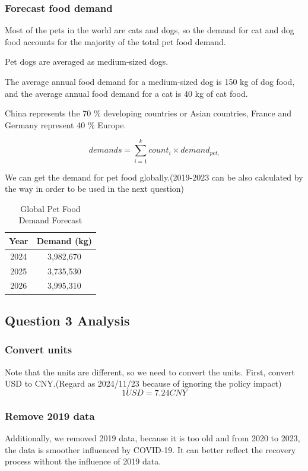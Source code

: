 \documentclass[withoutpreface,bwprint]{cumcmthesis} %
\begin{document}
\subsubsection{Forecast food demand}
\begin{assumption}
    Most of the pets in the world are cats and dogs, so the demand for cat and dog food accounts for the majority of the total pet food demand.
\end{assumption}
\begin{assumption}
    Pet dogs are averaged as medium-sized dogs.
\end{assumption}
\par The average annual food demand for a medium-sized dog is 150 kg of dog food, and the average annual food demand for a cat is 40 kg of cat food.\cite{4}
\begin{assumption}
    China represents the 70 \% developing countries or Asian countries, France and Germany represent 40 \% Europe.
\end{assumption}
 \[demands=\sum_{i=1}^{k} count_i \times demand_{pet_i}\]
\par We can get the demand for pet food globally.(2019-2023 can be also calculated by the way in order to be used in the next question)

\begin{table}[htbp]
\centering
\caption{Global Pet Food Demand Forecast}
\begin{tabular}{cc}
\toprule
Year & Demand (kg) \\
\midrule
2024 & 3,982,670 \\
2025 & 3,735,530 \\
2026 & 3,995,310 \\
\bottomrule
\end{tabular}
\end{table}


\subsection{Question 3 Analysis}
\subsubsection{Convert units}
\par Note that the units are different, so we need to convert the units. First, convert USD to CNY.(Regard as 2024/11/23 because of ignoring the policy impact)\cite{5}
\[1USD=7.24CNY\]
\subsubsection{Remove 2019 data}
\par Additionally, we removed 2019 data, because it is too old and from 2020 to 2023, the data is smoother influenced by COVID-19.
It can better reflect the recovery process without the influence of 2019 data.
\end{document}
